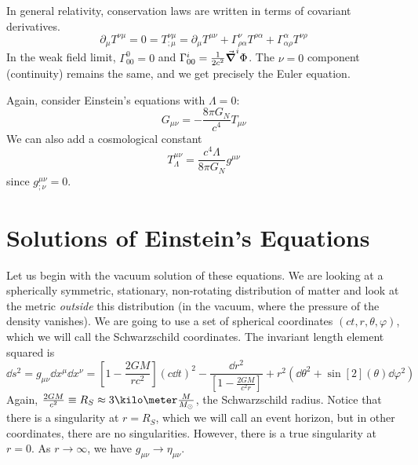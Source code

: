 \documentclass[a4paper,twoside,master.tex]{subfiles}
\begin{document}
In general relativity, conservation laws are written in terms of covariant derivatives.
\begin{equation}
    \partial_{\mu} T^{\nu \mu} = 0 = T^{\nu \mu}_{; \mu} = \partial_{\mu} T^{\mu \nu} + \Gamma^{\nu}_{\rho \alpha} T^{\rho \alpha} + \Gamma^{\alpha}_{\alpha \rho} T^{\nu \rho}
\end{equation}
In the weak field limit, $ \Gamma^{0}_{00} = 0 $ and $ \Gamma^{i}_{00} = \frac{1}{2 c^2} \grad^i{\Phi} $. The $ \nu = 0 $ component (continuity) remains the same, and we get precisely the Euler equation.


Again, consider Einstein's equations with $ \Lambda = 0 $:
\begin{equation}
    G_{\mu \nu} = - \frac{8 \pi G_N}{c^4} T_{\mu \nu}
\end{equation}
We can also add a cosmological constant
\begin{equation}
    T^{\mu \nu}_{\Lambda} = \frac{c^4 \Lambda}{8 \pi G_N} g^{\mu \nu}
\end{equation}
since $ g^{\mu \nu}_{; \nu} = 0 $.


\section{Solutions of Einstein's Equations}\label{sec:solutions_of_einstein's_equations}

Let us begin with the vacuum solution of these equations. We are looking at a spherically symmetric, stationary, non-rotating distribution of matter and look at the metric \textit{outside} this distribution (in the vacuum, where the pressure of the density vanishes). We are going to use a set of spherical coordinates $ (ct, r, \theta, \varphi) $, which we will call the Schwarzschild coordinates. The invariant length element squared is
\begin{equation}
    \dd{s^2} = g_{\mu \nu} \dd{x^{\mu}} \dd{x^{\nu}} = \left[ 1 - \frac{2GM}{r c^2} \right] (c \dd{t})^2 - \frac{\dd{r^2}}{\left[ 1 - \frac{2GM}{c^2 r} \right]} + r^2 (\dd{\theta^2} + \sin[2](\theta) \dd{\varphi^2})
\end{equation}
Again, $ \frac{2GM}{c^2} \equiv R_S \approx 3\kilo\meter \frac{M}{M_{\odot}} $, the Schwarzschild radius. Notice that there is a singularity at $ r = R_S $, which we will call an event horizon, but in other coordinates, there are no singularities. However, there is a true singularity at $ r = 0 $. As $ r \to \infty $, we have $ g_{\mu \nu} \to \eta_{\mu \nu} $.
\end{document}
